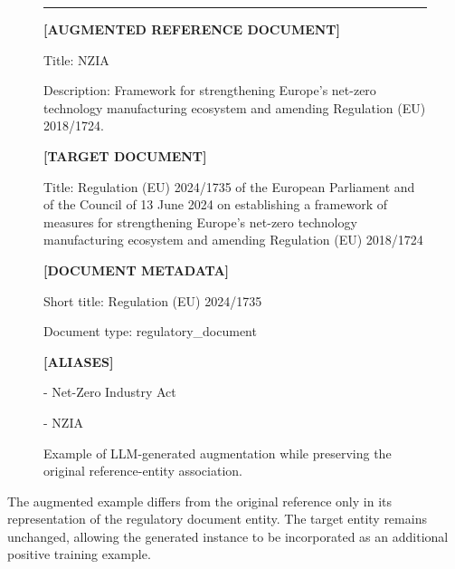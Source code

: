 \begin{figure}[H]
\begin{tcolorbox}[
    colback=gray!10,
    colframe=gray!50,
    boxrule=0.5pt,
    arc=2mm
]
\rule{\linewidth}{0.2pt}

\vspace{0.4cm}

\textbf{[AUGMENTED REFERENCE DOCUMENT]}

Title: NZIA

\vspace{0.2cm}

Description: Framework for strengthening Europe’s net-zero technology manufacturing ecosystem and amending Regulation (EU) 2018/1724.

\vspace{0.2cm}

\textbf{[TARGET DOCUMENT]}

Title: Regulation (EU) 2024/1735 of the European Parliament and of the Council of 13 June 2024 on establishing a framework of measures for strengthening Europe’s net-zero technology manufacturing ecosystem and amending Regulation (EU) 2018/1724

\vspace{0.2cm}

\textbf{[DOCUMENT METADATA]}

Short title: Regulation (EU) 2024/1735

Document type: regulatory\_document

\vspace{0.2cm}

\textbf{[ALIASES]}

- Net-Zero Industry Act

- NZIA

\end{tcolorbox}

\caption{Example of LLM-generated augmentation while preserving the original reference-entity association.}
\label{fig:llm_augmentation_example}

\end{figure}

The augmented example differs from the original reference only in its representation of the regulatory document entity. The target entity remains unchanged, allowing the generated instance to be incorporated as an additional positive training example.